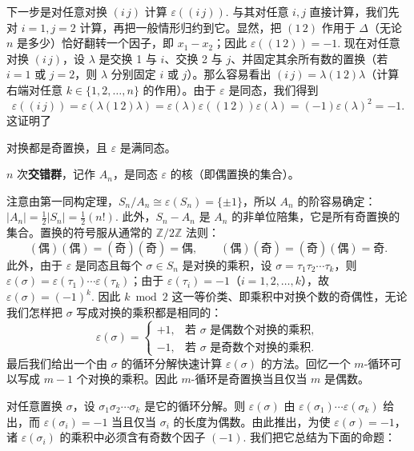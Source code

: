 下一步是对任意对换 \((i\, j)\) 计算 \(\varepsilon((i\, j))\). 与其对任意 \(i, j\) 直接计算，我们先对 \(i = 1, j = 2\) 计算，再把一般情形归约到它。显然，把 \((1\,2)\) 作用于 \(\Delta\)（无论 \(n\) 是多少）恰好翻转一个因子，即 \(x_1 - x_2\)；因此 \(\varepsilon((1\,2)) = -1\). 现在对任意对换 \((i\, j)\)，设 \(\lambda\) 是交换 1 与 \(i\)、交换 2 与 \(j\)、并固定其余所有数的置换（若 \(i = 1\) 或 \(j = 2\)，则 \(\lambda\) 分别固定 \(i\) 或 \(j\)）。那么容易看出 \((i\, j) = \lambda(1\,2)\lambda\)（计算右端对任意 \(k \in \{1, 2, \ldots, n\}\) 的作用）。由于 \(\varepsilon\) 是同态，我们得到
\[
\varepsilon((i\, j)) = \varepsilon(\lambda(1\,2)\lambda) = \varepsilon(\lambda)\varepsilon((1\,2))\varepsilon(\lambda) = (-1)\varepsilon(\lambda)^2 = -1.
\]
这证明了

\begin{proposition}\label{pro:3.24}
对换都是奇置换，且 \(\varepsilon\) 是满同态。
\end{proposition}

\begin{definition}
\(n\) 次\textbf{交错群}，记作 \(A_n\)，是同态 \(\varepsilon\) 的核（即偶置换的集合）。
\end{definition}

注意由第一同构定理，\(S_n/A_n \cong \varepsilon(S_n) = \{\pm 1\}\)，所以 \(A_n\) 的阶容易确定：\(|A_n| = \frac{1}{2}|S_n| = \frac{1}{2}(n!)\). 此外，\(S_n - A_n\) 是 \(A_n\) 的非单位陪集，它是所有奇置换的集合。置换的符号服从通常的 \(\mathbb{Z}/2\mathbb{Z}\) 法则：
\[
(\text{偶})(\text{偶}) = (\text{奇})(\text{奇}) = \text{偶}, \qquad (\text{偶})(\text{奇}) = (\text{奇})(\text{偶}) = \text{奇}.
\]
此外，由于 \(\varepsilon\) 是同态且每个 \(\sigma \in S_n\) 是对换的乘积，设 \(\sigma = \tau_1\tau_2\cdots\tau_k\)，则 \(\varepsilon(\sigma) = \varepsilon(\tau_1)\cdots\varepsilon(\tau_k)\)；由于 \(\varepsilon(\tau_i) = -1\)（\(i = 1, 2, \ldots, k\)），故 \(\varepsilon(\sigma) = (-1)^k\). 因此 \(k \bmod 2\) 这一等价类、即乘积中对换个数的奇偶性，无论我们怎样把 \(\sigma\) 写成对换的乘积都是相同的：
\[
\varepsilon(\sigma) = \begin{cases} +1, & \text{若 } \sigma \text{ 是偶数个对换的乘积}, \\ -1, & \text{若 } \sigma \text{ 是奇数个对换的乘积}. \end{cases}
\]
最后我们给出一个由 \(\sigma\) 的循环分解快速计算 \(\varepsilon(\sigma)\) 的方法。回忆一个 \(m\)-循环可以写成 \(m - 1\) 个对换的乘积。因此 \(m\)-循环是奇置换当且仅当 \(m\) 是偶数。

对任意置换 \(\sigma\)，设 \(\sigma_1\sigma_2\cdots\sigma_k\) 是它的循环分解。则 \(\varepsilon(\sigma)\) 由 \(\varepsilon(\sigma_1)\cdots\varepsilon(\sigma_k)\) 给出，而 \(\varepsilon(\sigma_i) = -1\) 当且仅当 \(\sigma_i\) 的长度为偶数。由此推出，为使 \(\varepsilon(\sigma) = -1\)，诸 \(\varepsilon(\sigma_i)\) 的乘积中必须含有奇数个因子 \((-1)\). 我们把它总结为下面的命题：

